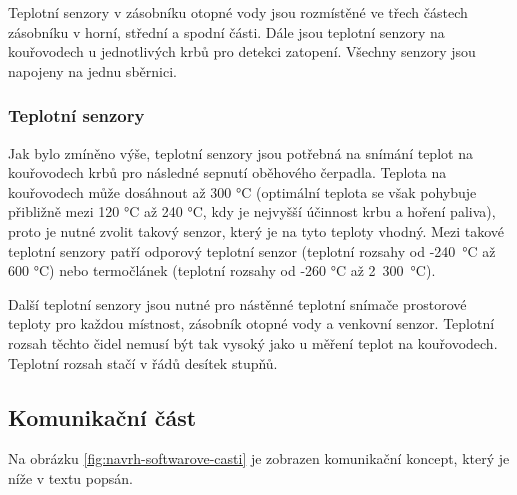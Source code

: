 Teplotní senzory v zásobníku otopné vody jsou rozmístěné ve třech částech zásobníku v horní, střední a spodní části. Dále jsou teplotní senzory na kouřovodech u jednotlivých krbů pro detekci zatopení. Všechny senzory jsou napojeny na jednu sběrnici.



\subsubsection{Teplotní senzory}
Jak bylo zmíněno výše, teplotní senzory jsou potřebná na snímání teplot na kouřovodech krbů pro následné sepnutí oběhového čerpadla. Teplota na kouřovodech může dosáhnout až 300 °C (optimální teplota se však pohybuje přibližně mezi 120 °C až 240 °C, kdy je nejvyšší účinnost krbu a hoření paliva), proto je nutné zvolit takový senzor, který je na tyto teploty vhodný. Mezi takové teplotní senzory patří odporový teplotní senzor (teplotní rozsahy od -240~°C až 600 °C) nebo termočlánek (teplotní rozsahy od -260 °C až 2~300~°C). %


Další teplotní senzory jsou nutné pro nástěnné teplotní snímače prostorové teploty pro každou místnost, zásobník otopné vody a venkovní senzor. Teplotní rozsah těchto čidel nemusí být tak vysoký jako u měření teplot na kouřovodech. Teplotní rozsah stačí v řádů desítek stupňů. %

\subsection{Komunikační část}

Na obrázku \ref{fig:navrh-softwarove-casti} je zobrazen komunikační koncept, který je níže v textu popsán.

